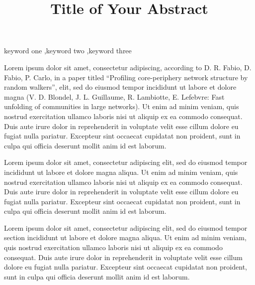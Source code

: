 \documentclass[preprint,12pt]{elsarticle}
\begin{document}
\begin{frontmatter}

\title{Title of Your Abstract}

\begin{keyword}
keyword one \sep keyword two \sep keyword three
\end{keyword}

\end{frontmatter}

\linenumbers


Lorem ipsum dolor sit amet, consectetur adipiscing, according to D. R. Fabio, D. Fabio, P. Carlo, in a paper titled ``Profiling core-periphery network structure by random walkers'',   elit, sed do eiusmod tempor incididunt ut labore et dolore magna  (V. D. Blondel, J. L. Guillaume, R. Lambiotte, E. Lefebvre: Fast unfolding of communities in large networks). Ut enim ad minim veniam, quis nostrud exercitation ullamco laboris nisi ut aliquip ex ea commodo consequat. Duis aute irure dolor in reprehenderit in voluptate velit esse cillum dolore eu fugiat nulla pariatur. Excepteur sint occaecat cupidatat non proident, sunt in culpa qui officia deserunt mollit anim id est laborum.

Lorem ipsum dolor sit amet, consectetur adipiscing elit, sed do eiusmod tempor incididunt ut labore et dolore magna aliqua. Ut enim ad minim veniam, quis nostrud exercitation ullamco laboris nisi ut aliquip ex ea commodo consequat. Duis aute irure dolor in reprehenderit in voluptate velit esse cillum dolore eu fugiat nulla pariatur. Excepteur sint occaecat cupidatat non proident, sunt in culpa qui officia deserunt mollit anim id est laborum.

Lorem ipsum dolor sit amet, consectetur adipiscing elit, sed do eiusmod tempor section incididunt ut labore et dolore magna aliqua. Ut enim ad minim veniam, quis nostrud exercitation ullamco laboris nisi ut aliquip ex ea commodo consequat. Duis aute irure dolor in reprehenderit in voluptate velit esse cillum dolore eu fugiat nulla pariatur. Excepteur sint occaecat cupidatat non proident, sunt in culpa qui officia deserunt mollit anim id est laborum.
\end{document}
